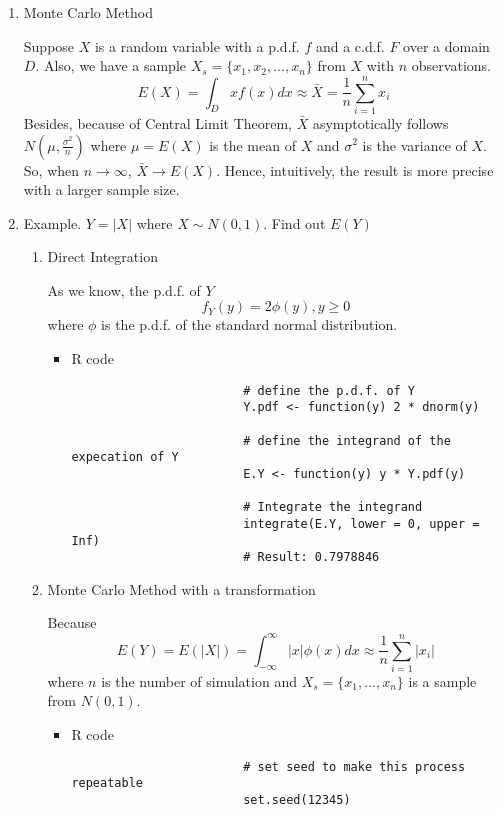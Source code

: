 \begin{enumerate}
	\item Monte Carlo Method
	\par Suppose $X$ is a random variable with a p.d.f. $f$ and a c.d.f. $F$ over a domain $D$. Also, we have a sample $X_s = \{x_1, x_2, ..., x_n\}$ from $X$ with $n$ observations.
	\begin{equation*}
		E(X) = \int_{D}xf(x)dx \approx \bar{X} = \frac{1}{n} \sum_{i = 1}^{n}x_i
	\end{equation*}
	Besides, because of Central Limit Theorem, $\bar{X}$ asymptotically follows $N(\mu, \frac{\sigma^2}{n})$ where $\mu = E(X)$ is the mean of $X$ and $\sigma^2$ is the variance of $X$. So, when $n \rightarrow \infty$, $\bar{X} \rightarrow E(X)$. Hence, intuitively, the result is more precise with a larger sample size.
	\item Example. $Y = |X|$ where $X \sim N(0, 1)$. Find out $E(Y)$
		\begin{enumerate}
			\item Direct Integration
				\par As we know, the p.d.f. of $Y$
				\begin{equation*}
					f_Y(y) = 2\phi(y), y \ge 0
				\end{equation*}
				where $\phi$ is the p.d.f. of the standard normal distribution.
				\begin{itemize}
					\item R code
					\begin{verbatim}
						# define the p.d.f. of Y
						Y.pdf <- function(y) 2 * dnorm(y)
						
						# define the integrand of the expecation of Y
						E.Y <- function(y) y * Y.pdf(y)
						
						# Integrate the integrand
						integrate(E.Y, lower = 0, upper = Inf)
						# Result: 0.7978846
					\end{verbatim}
				\end{itemize}
			\item Monte Carlo Method with a transformation
				\par Because 
				\begin{equation*}
					E(Y) = E(|X|) = \int_{-\infty}^{\infty}|x| \phi(x)dx \approx \frac{1}{n}\sum_{i = 1}^{n} |x_i|
				\end{equation*}
				where $n$ is the number of simulation and $X_s = \{ x_1, ..., x_n\}$ is a sample from $N(0, 1)$.
				\begin{itemize}
					\item R code
					\begin{verbatim}
						# set seed to make this process repeatable
						set.seed(12345)
						

\end{verbatim}
\end{itemize}
\end{enumerate}
\end{enumerate}
